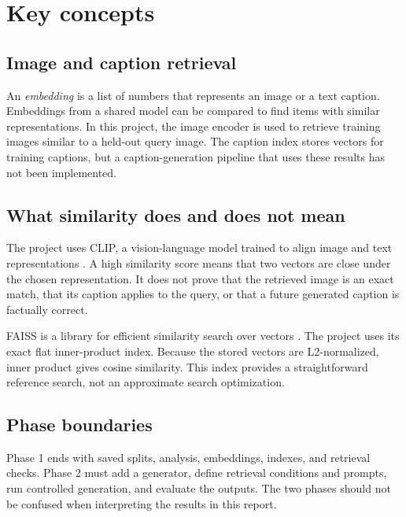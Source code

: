 \section{Key concepts}
\label{sec:concepts}

\subsection{Image and caption retrieval}
An \emph{embedding} is a list of numbers that represents an image or a text caption. Embeddings from a shared model can be compared to find items with similar representations. In this project, the image encoder is used to retrieve training images similar to a held-out query image. The caption index stores vectors for training captions, but a caption-generation pipeline that uses these results has not been implemented.

\subsection{What similarity does and does not mean}
The project uses CLIP, a vision-language model trained to align image and text representations \citep{radford2021clip,clipmodelcard}. A high similarity score means that two vectors are close under the chosen representation. It does not prove that the retrieved image is an exact match, that its caption applies to the query, or that a future generated caption is factually correct.

FAISS is a library for efficient similarity search over vectors \citep{douze2024faiss,faissdocs}. The project uses its exact flat inner-product index. Because the stored vectors are L2-normalized, inner product gives cosine similarity. This index provides a straightforward reference search, not an approximate search optimization.

\subsection{Phase boundaries}
Phase 1 ends with saved splits, analysis, embeddings, indexes, and retrieval checks. Phase 2 must add a generator, define retrieval conditions and prompts, run controlled generation, and evaluate the outputs. The two phases should not be confused when interpreting the results in this report.
